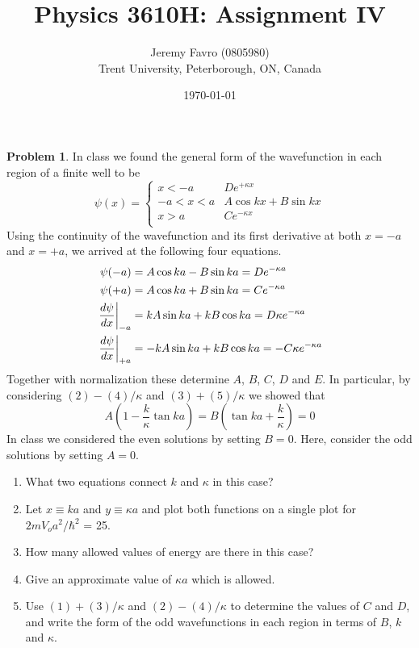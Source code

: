 \documentclass[10pt]{article}
\title{Physics 3610H: Assignment IV}
\author{Jeremy Favro (0805980) \\ Trent University, Peterborough, ON, Canada}
\date{\today}
\theoremstyle{definition}
\newtheorem{problem}{Problem}
\begin{document}
\maketitle

\begin{problem}
In class we found the general form of the wavefunction in each region of a finite well to
be
$$
\psi(x)=
  \begin{cases}
    x<-a   & De^{+\kappa x}       \\
    -a<x<a & A\cos kx + B \sin kx \\
    x> a   & Ce^{-\kappa x}       \\
  \end{cases}
$$
Using the continuity of the wavefunction and its first derivative at both $x = -a$ and $x = +a$,
we arrived at the following four equations.
\begin{align}
  \psi(-a)                     & =A\cos ka - B \sin ka  = De^{-\kappa a}          \\
  \psi(+a)                     & =A\cos ka + B \sin ka  = Ce^{-\kappa a}          \\
  \eval{\frac{d\psi}{dx}}_{-a} & = kA\sin ka +kB\cos ka = D\kappa e^{-\kappa a}   \\
  \eval{\frac{d\psi}{dx}}_{+a} & = -kA\sin ka +kB\cos ka = -C\kappa e^{-\kappa a}
\end{align}
Together with normalization these determine $A$, $B$, $C$, $D$ and $E$. In particular, by considering
$(2)-(4)/\kappa$ and $(3)+(5)/\kappa$ we showed that
$$
  A\left(1-\frac{k}{\kappa}\tan ka\right) = B\left(\tan ka + \frac{k}{\kappa}\right)=0
$$
In class we considered the even solutions by setting $B = 0$. Here, consider the odd solutions
by setting $A = 0$.
\begin{enumerate}[label=(\alph*)]
  \item What two equations connect $k$ and $\kappa$ in this case?
  \item Let $x \equiv  ka$ and $y \equiv \kappa a$ and plot both functions on a single plot for $2mV_oa^2/\hbar^2$ = 25.
  \item How many allowed values of energy are there in this case?
  \item Give an approximate value of $\kappa a$ which is allowed.
  \item Use $(1)+(3)/\kappa$ and $(2)-(4)/\kappa$ to determine the values of $C$ and $D$, and write the form of
        the odd wavefunctions in each region in terms of $B$, $k$ and $\kappa$.
\end{enumerate}
\end{problem}
\end{document}
